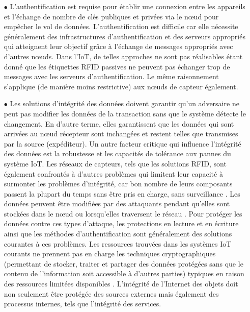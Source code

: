 	\begin{itemize}
		\item[$\bullet$] L'authentif{\kern0pt}ication est requise pour établir une connexion entre les appareils et l'échange de nombre de clés publiques et privées via le nœud pour empêcher le vol de données. L'authentif{\kern0pt}ication est dif{\kern0pt}f{\kern0pt}icile car elle nécessite généralement des infrastructures d'authentif{\kern0pt}ication et des serveurs appropriés qui atteignent leur objectif grâce à l'échange de messages appropriés avec d'autres nœuds. Dans l'IoT, de telles approches ne sont pas réalisables étant donné que les étiquettes RFID passives ne peuvent pas échanger trop de messages avec les serveurs d'authentif{\kern0pt}ication. Le même raisonnement s'applique (de manière moins restrictive) aux nœuds de capteur également.\\
		
		\item[$\bullet$] Les solutions d'intégrité des données doivent garantir qu'un adversaire ne peut pas modif{\kern0pt}ier les données de la transaction sans que le système détecte le changement. En d’autre terme, elles garantissent que les données qui sont arrivées au nœud récepteur sont inchangées et restent telles que transmises par la source (expéditeur). Un autre facteur critique qui influence l'intégrité des données est la robustesse et les capacités de tolérance aux pannes du système IoT. Les réseaux de capteurs, tels que les solutions RFID, sont également confrontés à d'autres problèmes qui limitent leur capacité à surmonter les problèmes d'intégrité, car bon nombre de leurs composants passent la plupart du temps sans être pris en charge, sans surveillance \cite{musonda2018iot}. Les données peuvent être modif{\kern0pt}iées par des attaquants pendant qu'elles sont stockées dans le nœud ou lorsqu'elles traversent le réseau \cite{karygiannis2007guidelines}. Pour protéger les données contre ces types d'attaque, les protections en lecture et en écriture ainsi que les méthodes d'authentif{\kern0pt}ication sont généralement des solutions courantes à ces problèmes. Les ressources trouvées dans les systèmes IoT courants ne prennent pas en charge les techniques cryptographiques (permettant de stocker, traiter et partager des données protégées sans que le contenu de l'information soit accessible à d'autres parties) typiques en raison des ressources limitées disponibles \cite{musonda2018iot}. L'intégrité de l'Internet des objets doit non seulement être protégée des sources externes mais également des processus internes, tels que l'intégrité des services.
	\end{itemize}
